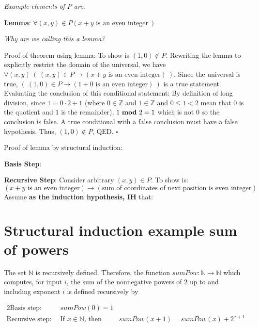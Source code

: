 \documentclass[12pt, oneside]{article}
\begin{document}
{\it Example elements of $P$ are}:
\vspace{40pt}

{\bf Lemma}: $\forall (x,y) \in P( x+y \textrm{ is an even integer}~)$

{\it Why are we calling this a lemma?}


Proof of theorem using lemma: To show is $(1,0) \notin P$. Rewriting the lemma to explicitly 
restrict the domain of the universal, 
we have $\forall (x,y) ~(~ (x,y) \in P  \to (x+y \textrm{ is an even integer})~)$.  Since
the universal is true, 
$ (~ (1,0) \in P \to (1+0 \textrm{ is an even integer})~)$ is a true statement.
Evaluating the conclusion of this conditional statement: 
By definition of long division, since $1 = 0 \cdot 2 + 1$ (where $0 \in \mathbb{Z}$ and 
$1 \in \mathbb{Z}$ and $0 \leq 1 < 2$ mean that $0$ is the quotient and $1$ is the remainder), $1 ~\textrm{\bf mod}~ 2 = 1$ which is not $0$ 
so the conclusion is false.  A true conditional with a false conclusion must have a false hypothesis.
Thus, $(1,0) \notin P$, QED. $\square$

\vspace{20pt}

Proof of lemma by structural induction:

{\bf Basis Step}:

\vspace{100pt}


{\bf Recursive Step}:  Consider arbitrary $(x,y) \in P$.  To show is:
\[
(x+y \text{ is an even integer}) \to (\text{sum of coordinates of next position is even integer})
\]
Assume {\bf as the induction hypothesis, IH} that: 


\vspace{400pt} \vfill
\section*{Structural induction example sum of powers}


The set $\mathbb{N}$ is recursively defined.
Therefore, the function $sumPow: \mathbb{N} \to \mathbb{N}$
which computes, for input $i$, the sum of the nonnegative powers of $2$
up to and including exponent $i$ is defined
recursively by

\begin{alignat*}{2}
    \text{Basis step:  } \qquad & sumPow(0) = 1 &\\
    \text{Recursive step:  } & \text{If } x \in \mathbb{N} \text{, then } &sumPow(x+1) = sumPow(x) + 2^{x+1}
\end{alignat*}
\end{document}
